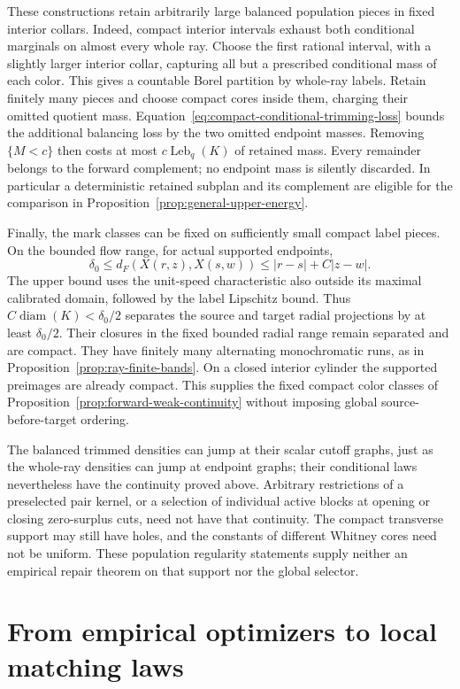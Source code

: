 \documentclass[11pt,reqno]{amsart}
\theoremstyle{definition}
\theoremstyle{remark}
\numberwithin{equation}{section}
\begin{document}
These constructions retain arbitrarily large balanced population
pieces in fixed interior collars. Indeed, compact interior intervals
exhaust both conditional marginals on almost every whole ray. Choose
the first rational interval, with a slightly larger interior collar,
capturing all but a prescribed conditional mass of each color. This
gives a countable Borel partition by whole-ray labels. Retain finitely
many pieces and choose compact cores inside them, charging their
omitted quotient mass. Equation~\eqref{eq:compact-conditional-trimming-loss}
bounds the additional balancing loss by the two omitted endpoint
masses. Removing \(\{M<c\}\) then costs at most
\(c\operatorname{Leb}_q(K)\) of retained mass. Every remainder
belongs to the forward complement; no endpoint mass is silently
discarded. In particular a deterministic retained subplan and its
complement are eligible for the comparison in
Proposition~\ref{prop:general-upper-energy}.

Finally, the mark classes can be fixed on sufficiently small compact
label pieces. On the bounded flow range, for actual supported endpoints,
\[
 \delta_0\le d_F(X(r,z),X(s,w))
                   \le |r-s|+C|z-w|.
\]
The upper bound uses the unit-speed characteristic also outside its
maximal calibrated domain, followed by the label Lipschitz bound.
Thus \(C\operatorname{diam}(K)<\delta_0/2\) separates the source
and target radial projections by at least \(\delta_0/2\). Their
closures in the fixed bounded radial range remain separated and are
compact. They have finitely many alternating monochromatic runs, as
in Proposition~\ref{prop:ray-finite-bands}. On a closed interior
cylinder the supported preimages are already compact. This supplies
the fixed compact color classes of
Proposition~\ref{prop:forward-weak-continuity} without imposing global
source-before-target ordering.

The balanced trimmed densities can jump at their scalar cutoff graphs,
just as the whole-ray densities can jump at endpoint graphs; their
conditional laws nevertheless have the continuity proved above.
Arbitrary restrictions of a preselected pair kernel, or a selection of
individual active blocks at opening or closing zero-surplus cuts, need
not have that continuity. The compact transverse support may still
have holes, and the constants of different Whitney cores need not be
uniform. These population regularity statements supply neither an
empirical repair theorem on that support nor the global selector.


\section{From empirical optimizers to local matching laws}
\label{sec:highd-optimizer}
\end{document}
